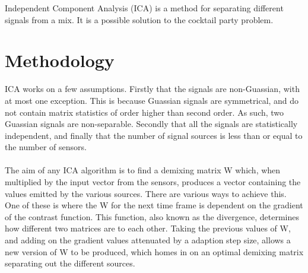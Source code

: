 \label{appendix:ica}
Independent Component Analysis (ICA) is a method for separating different signals from a mix.
It is a possible solution to the cocktail party problem.

\section{Methodology}

ICA works on a few assumptions.
Firstly that the signals are non-Guassian, with at most one exception.
This is because Guassian signals are symmetrical, and do not contain matrix statistics of order higher than second order.
As such, two Guassian signals are non-separable.
Secondly that all the signals are statistically independent, and finally that the number of signal sources is less than or equal to the number of sensors.
\\
\\
The aim of any ICA algorithm is to find a demixing matrix W which, when multiplied by the input vector from the sensors, produces a vector containing the values emitted by the various sources.
There are various ways to achieve this.
One of these is where the W for the next time frame is dependent on the gradient of the contrast function.
This function, also known as the divergence, determines how different two matrices are to each other.
Taking the previous values of W, and adding on the gradient values attenuated by a adaption step size, allows a new version of W to be produced, which homes in on an optimal demixing matrix separating out the different sources.

